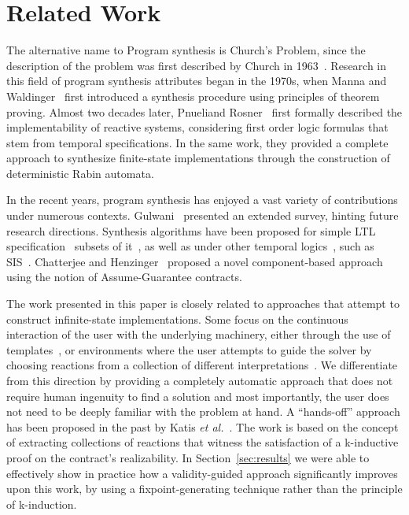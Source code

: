 \section{Related Work}
\label{sec:related}


The alternative name to Program synthesis is Church's Problem, since the description of the problem was first described by Church in 1963~\cite{church1962logic}. Research in this field of program synthesis attributes began in the 1970s, when Manna and Waldinger~\cite{manna1971toward} first introduced a synthesis procedure using principles of theorem proving. Almost two decades later, Pnueliand Rosner~\cite{pnueli1989synthesis} first formally described the
implementability of reactive systems, considering first order logic formulas
that stem from temporal specifications. In the same work, they provided a
complete approach to synthesize finite-state implementations through the
construction of deterministic Rabin automata.

In the recent years, program synthesis has enjoyed a vast variety of
contributions under numerous contexts. Gulwani~\cite{gulwani2010dimensions}
presented an extended survey, hinting future research directions. Synthesis
algorithms have been proposed for simple LTL specification~\cite{Bohy12,Tini03}
subsets of it~\cite{Klein10,ehlers2010symbolic,cheng2016structural}, as well as under other temporal logics~\cite{monmege2016real,Hamza10}, such as SIS~\cite{Aziz95}.
Chatterjee and Henzinger~\cite{Chatterjee07} proposed a novel component-based approach using the notion of Assume-Guarantee contracts. 

The work presented in this paper is closely related to approaches that attempt
to construct infinite-state implementations. Some focus on the continuous
interaction of the user with the underlying machinery, either through the use of
templates~\cite{srivastava2013template,beyene2014constraint}, or environments where the user attempts to guide the solver by choosing reactions from a collection of different
interpretations~\cite{ryzhyk2016developing}. We differentiate from this
direction by providing a completely automatic approach that does not require
human ingenuity to find a solution and most importantly, the user
does not need to be deeply familiar with the problem at hand. A ``hands-off''
approach has been proposed in the past by Katis \textit{et
al.}~\cite{gacek2015towards,katis2016towards,katis2016synthesis}. The work is
based on the concept of extracting collections of reactions that witness the satisfaction of a k-inductive proof on the contract's realizability. In
Section~\ref{sec:results} we were able to effectively show in practice how a
validity-guided approach significantly improves upon this work, by using a
fixpoint-generating technique rather than the principle of k-induction.

